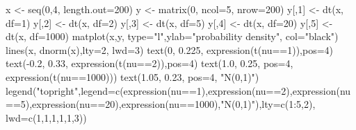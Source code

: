 \begin{Schunk}
\begin{Sinput}
 x <- seq(0,4, length.out=200)
 y <- matrix(0, ncol=5, nrow=200)
 y[,1] <- dt(x, df=1)
 y[,2] <- dt(x, df=2)
 y[,3] <- dt(x, df=5)
 y[,4] <- dt(x, df=20)
 y[,5] <- dt(x, df=1000)
 matplot(x,y,  type="l",ylab="probability density", col="black")
 lines(x, dnorm(x),lty=2, lwd=3)
 text(0, 0.225, expression(t(nu==1)),pos=4)
 text(-0.2, 0.33, expression(t(nu==2)),pos=4)
 text(1.0, 0.25, pos=4, expression(t(nu==1000)))
 text(1.05, 0.23, pos=4, "N(0,1)")
 legend("topright",legend=c(expression(nu==1),expression(nu==2),expression(nu==5),expression(nu==20),expression(nu==1000),"N(0,1)"),lty=c(1:5,2), lwd=c(1,1,1,1,1,3))
\end{Sinput}
\end{Schunk}
